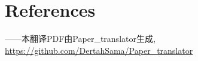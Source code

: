 \documentclass[oneside,onecolumn]{article}
\date{}
\title{}
\author{Author1, Author2}
\begin{document}
\begin{sloppypar}

\maketitle




\section*{References}
\end{sloppypar}	
\begin{flushright}
	\vfill \footnotesize
	——本翻译PDF由Paper_translator生成, \url{https://github.com/DertahSama/Paper_translator}
\end{flushright}
\end{document}
